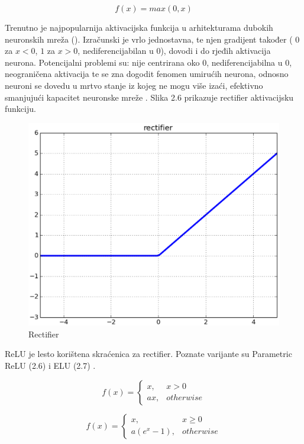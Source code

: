 \documentclass[times, utf8, diplomski]{fer}
\begin{document}
\begin{equation}
    f(x)=max(0,x)
\end{equation}

Trenutno je najpopularnija aktivacijska funkcija u arhitekturama dubokih neuronskih mreža (\cite{rect}). Izračunski je vrlo jednostavna, te njen gradijent također ( $0$ za $x<0$, $1$ za $x>0$, nediferencijabilan u $0$), dovodi i do rjeđih aktivacija neurona. Potencijalni problemi su: nije centrirana oko $0$, nediferencijabilna u $0$, neograničena aktivacija te se zna dogodit fenomen umirućih neurona, odnosno neuroni se dovedu u mrtvo stanje iz kojeg ne mogu više izaći, efektivno smanjujući kapacitet neuronske mreže \cite{rect}. Slika 2.6 prikazuje rectifier aktivacijsku funkciju.

\begin{figure}[htbp]
    \centering
    \includegraphics[scale=0.5]{Slike/rect}
    \caption{Rectifier \cite{rectpic}}
\end{figure}

ReLU je lesto korištena skraćenica za rectifier. Poznate varijante su Parametric ReLU (2.6) i ELU (2.7) \cite{rect}.

\begin{equation}
    f(x)=
    \begin{cases}
      x, & x > 0 \\
      ax, & otherwise
    \end{cases}
\end{equation}

\begin{equation}
    f(x)=
    \begin{cases}
      x, & x \geq 0 \\
      a(e^x - 1), & otherwise
    \end{cases}
\end{equation}
\end{document}
